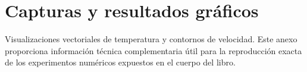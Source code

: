 \chapter{Capturas y resultados gráficos}
\label{chap:anexoF}

Visualizaciones vectoriales de temperatura y contornos de velocidad.
Este anexo proporciona información técnica complementaria útil para la reproducción exacta de los experimentos numéricos expuestos en el cuerpo del libro.
